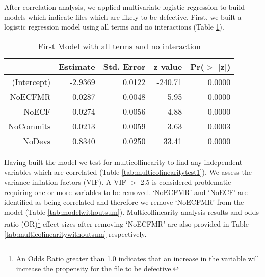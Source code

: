 \documentclass[times]{smrauth}
\begin{document}


After correlation analysis, we applied multivariate logistic regression to build models which indicate files which are likely to be defective.
First, we built a logistic regression model using all terms and no interactions (Table \ref{tab:modelwithallterms}).   


\begin{table}[tbp]
\centering
\caption{First Model with all terms and no interaction} 
\label{tab:modelwithallterms}
\begin{tabular}{rrrrr}
  \hline
 & Estimate & Std. Error & z value & Pr($>$ $|$z$|$) \\ 
  \hline
(Intercept) & -2.9369 & 0.0122 & -240.71 & 0.0000 \\ 
  NoECFMR & 0.0287 & 0.0048 & 5.95 & 0.0000 \\ 
  NoECF & 0.0274 & 0.0056 & 4.88 & 0.0000 \\ 
  NoCommits & 0.0213 & 0.0059 & 3.63 & 0.0003 \\ 
  NoDevs & 0.8340 & 0.0250 & 33.41 & 0.0000 \\ 
   \hline
\end{tabular}
\end{table}%

Having built the model we test for multicollinearity to find any independent variables which are correlated (Table \ref{tab:multicolinearitytest1}). We assess the variance inflation factors (VIF).  A VIF $>$ 2.5 is considered problematic requiring one or more variables to be removed. `NoECFMR' and `NoECF' are identified as being correlated and therefore we remove `NoECFMR' from the model (Table \ref{tab:modelwithoutsum}). 
Multicollinearity analysis results and odds ratio (OR)\footnote{An Odds Ratio greater than 1.0 indicates that an increase in the variable will increase the propensity for the file to be defective.} effect sizes after removing `NoECFMR' are also provided in Table \ref{tab:multicolinearitywithoutsum} respectively. 
\end{document}
